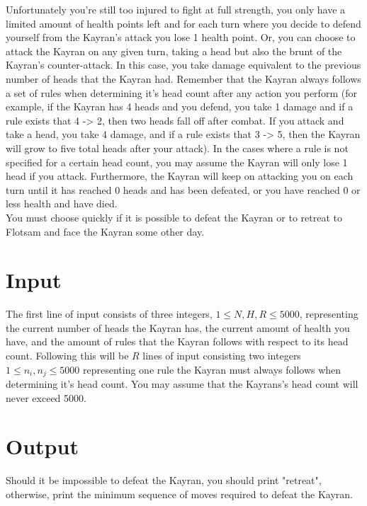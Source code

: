 \noindent Unfortunately you're still too injured to fight at full strength, you only have a limited amount of health points left 
and for each turn where you decide to defend yourself from the Kayran's attack you lose 1 health point. Or, you can choose to
attack the Kayran on any given turn, taking a head but also the brunt of the Kayran's counter-attack. In this case, you take damage 
equivalent to the previous number of heads that the Kayran had. Remember that the Kayran always follows a set of rules when determining it's head
count after any action you perform (for example, if the Kayran has 4 heads and you defend, you take 1 damage and if a rule exists that 4 -> 2, 
then two heads fall off after combat. If you attack and take a head, you take 4 damage, and if a rule exists that 3 -> 5, then the 
Kayran will grow to five total heads after your attack). In the cases where a rule is not specified for a certain head count, you may assume the 
Kayran will only lose 1 head if you attack. Furthermore, the Kayran will keep on attacking you on each turn until it has reached 0 heads and 
has been defeated, or you have reached 0 or less health and have died. \\

\noindent You must choose quickly if it is possible to defeat the Kayran or to retreat to Flotsam and face the Kayran
some other day.\\

\section*{Input}

The first line of input consists of three integers, $1 \leq N, H, R \leq 5000$, representing the current number of heads the
Kayran has, the current amount of health you have, and the amount of rules that the Kayran follows with respect to its
head count. Following this will be $R$ lines of input consisting two integers $1 \leq n_i , n_j \leq 5000$ representing one
rule the Kayran must always follows when determining it's head count. You may assume that the Kayrans's head count will never
exceed 5000. \\

\section*{Output}
Should it be impossible to defeat the Kayran, you should print "retreat", otherwise, print the minimum sequence of 
moves required to defeat the Kayran. \\
